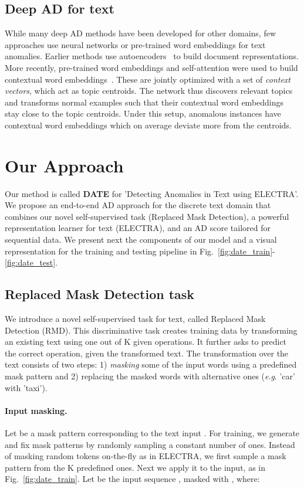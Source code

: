 \documentclass[11pt]{article}
\newcommand{\eg}{\textit{e}.\textit{g}. }
\begin{document}
\subsection{Deep AD for text}
While many deep AD methods have been developed for other domains, few approaches use neural networks or pre-trained word embeddings for text anomalies. Earlier methods use autoencoders~\cite{Manevitz2007} to build document representations. More recently, pre-trained word embeddings and self-attention were used to build contextual word embeddings~\cite{acl2019}. These are jointly optimized with a set of \emph{context vectors}, which act as topic centroids. The network thus discovers relevant topics and transforms normal examples such that their contextual word embeddings stay close to the topic centroids. Under this setup, anomalous instances have contextual word embeddings which on average deviate more from the centroids.

\section{Our Approach}
Our method is called \textbf{DATE} for 'Detecting Anomalies in Text using ELECTRA'. We propose an end-to-end AD approach for the discrete text domain that combines our novel self-supervised task (Replaced Mask Detection), a powerful representation learner for text (ELECTRA), and an AD score tailored for sequential data. We present next the components of our model and a visual representation for the training and testing pipeline in Fig.~\ref{fig:date_train}-\ref{fig:date_test}.


\subsection{Replaced Mask Detection task}
We introduce a novel self-supervised task for text, called Replaced Mask Detection (RMD). This discriminative task creates training data by transforming an existing text using one out of K given operations. It further asks to predict the correct operation, given the transformed text. The transformation over the text consists of two steps: 1) \emph{masking} some of the input words using a predefined mask pattern and 2) replacing the masked words with alternative ones (\eg 'car' with 'taxi').

\paragraph{Input masking.} Let  be a mask pattern corresponding to the text input . For training, we generate and fix  mask patterns  by randomly sampling a constant number of ones. Instead of masking random tokens on-the-fly as in ELECTRA, we first sample a mask pattern from the K predefined ones. Next we apply it to the input, as in Fig.~\ref{fig:date_train}.
Let  be the input sequence , masked with , where:
\end{document}
